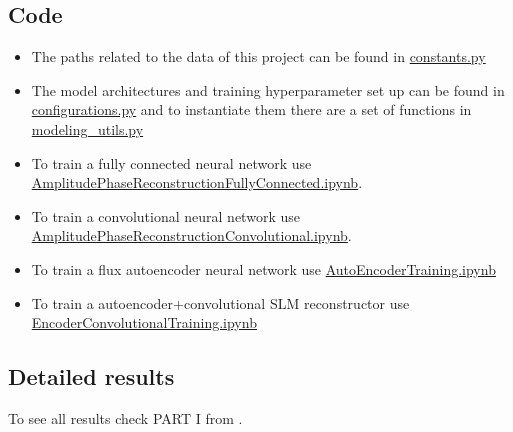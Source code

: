 	\subsection{Code}
		\begin{itemize}
			\item The paths related to the data of this project can be found in \href{https://github.com/Dacarpe03/PLImageReconstruction/blob/main/Utils/constants.py}{constants.py}
			\item The model architectures and training hyperparameter set up can be found in \href{https://github.com/Dacarpe03/PLImageReconstruction/blob/main/Utils/configurations.py}{configurations.py} and to instantiate them there are a set of functions in \href{https://github.com/Dacarpe03/PLImageReconstruction/blob/main/Utils/configurations.py}{modeling\_utils.py}
			\item To train a fully connected neural network use \href{https://github.com/Dacarpe03/PLImageReconstruction/blob/main/AmpPhaseReconstruction/AmplitudePhaseReconstructionFullyConnected.ipynb}{AmplitudePhaseReconstructionFullyConnected.ipynb}.
			\item To train a convolutional neural network use \href{https://github.com/Dacarpe03/PLImageReconstruction/blob/main/AmpPhaseReconstruction/AmplitudePhaseReconstructionConvolutional.ipynb}{AmplitudePhaseReconstructionConvolutional.ipynb}.
			\item To train a flux autoencoder neural network use \href{https://github.com/Dacarpe03/PLImageReconstruction/blob/main/AmpPhaseReconstruction/AutoEncoderTraining.ipynb}{AutoEncoderTraining.ipynb}
			\item To train a autoencoder+convolutional SLM reconstructor use \href{https://github.com/Dacarpe03/PLImageReconstruction/blob/main/AmpPhaseReconstruction/EncoderConvolutionalTraining.ipynb}{EncoderConvolutionalTraining.ipynb}
		\end{itemize}
		
	\subsection{Detailed results}
		To see all results check PART I from .
	
		